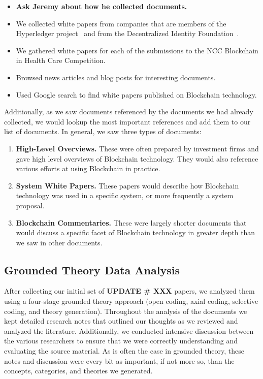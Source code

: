 \begin{itemize}
	\item \textbf{Ask Jeremy about how he collected documents.}
	\item We collected white papers from companies that are members of the Hyperledger project~\cite{hyperledger} and from the Decentralized Identity Foundation~\cite{somethingHere}.
	\item We gathered white papers for each of the submissions to the NCC Blockchain in Health Care Competition.
	\item Browsed news articles and blog posts for interesting documents.
	\item Used Google search to find white papers published on Blockchain technology.
\end{itemize}

Additionally, as we saw documents referenced by the documents we had already collected, we would lookup the most important references and add them to our list of documents. In general, we saw three types of documents:

\begin{enumerate}
	\item \textbf{High-Level Overviews.} These were often prepared by investment firms and gave high level overviews of Blockchain technology. They would also reference various efforts at using Blockchain in practice.
	\item \textbf{System White Papers.} These papers would describe how Blockchain technology was used in a specific system, or more frequently a system proposal.
	\item \textbf{Blockchain Commentaries.} These were largely shorter documents that would discuss a specific facet of Blockchain technology in greater depth than we saw in other documents.
\end{enumerate}

\subsection{Grounded Theory Data Analysis}
After collecting our initial set of \textbf{UPDATE \# XXX} papers, we analyzed them using a four-stage grounded theory approach (open coding, axial coding, selective coding, and theory generation).
Throughout the analysis of the documents we kept detailed research notes that outlined our thoughts as we reviewed and analyzed the literature.
Additionally, we conducted intensive discussion between the various researchers to ensure that we were correctly understanding and evaluating the source material.
As is often the case in grounded theory, these notes and discussion were every bit as important, if not more so, than the concepts, categories, and theories we generated.

